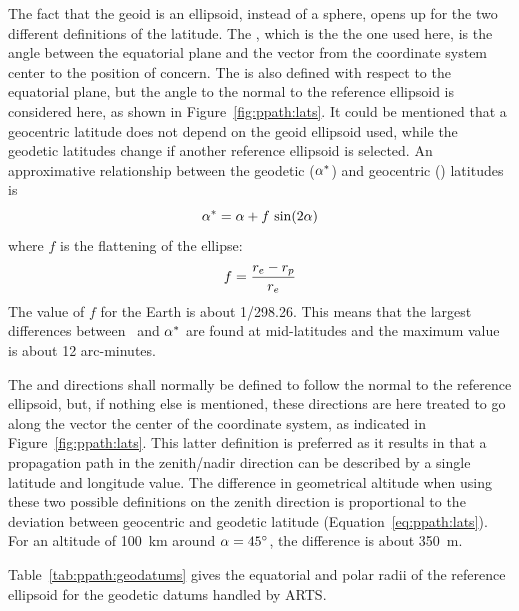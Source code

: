 \label{sec:ppath:geolat}

The fact that the geoid is an ellipsoid, instead of a sphere, opens up
for the two different definitions of the latitude. The
, which is the the one used here, is the
angle between the equatorial plane and the vector from the coordinate
system center to the position of concern. The  is also defined with respect to the equatorial plane, but
the angle to the normal to the reference ellipsoid is considered here, as
shown in Figure~\ref{fig:ppath:lats}. It could be mentioned that a
geocentric latitude does not depend on the geoid ellipsoid used, while
the geodetic latitudes change if another reference ellipsoid is
selected. An approximative relationship between the geodetic
($\alpha^*$) and geocentric (\Lat) latitudes is \citep{montenbruck:00}
\begin{equation}
 \alpha^* = \alpha + f\,\sin(2\alpha)  
 \label{eq:ppath:lats}
\end{equation}
where $f$ is the flattening of the ellipse:
\begin{equation}
 f = \frac{r_{e}-r_{p}}{r_{e}}
 \label{eq:ppath:flattening}
\end{equation}
The value of $f$ for the Earth is about 1/298.26. This means that the
largest differences between \Lat\ and $\alpha^*$ are found at
mid-latitudes and the maximum value is about 12 arc-minutes.

The  and  directions shall normally be
defined to follow the normal to the reference ellipsoid, but, if
nothing else is mentioned, these directions are here treated to go
along the vector the center of the coordinate system, as indicated in
Figure~\ref{fig:ppath:lats}. This latter definition is preferred
as it results in that a propagation path in the zenith/nadir direction
can be described by a single latitude and longitude value. The
difference in geometrical altitude when using these two possible
definitions on the zenith direction is proportional to the deviation
between geocentric and geodetic latitude (Equation~\ref{eq:ppath:lats}).
For an altitude of 100~km around $\alpha=45^\circ$, the difference is
about 350~m.


\label{sec:ppath:geodatums}

Table~\ref{tab:ppath:geodatums} gives the equatorial and polar radii
of the reference ellipsoid for the geodetic datums handled by ARTS.

